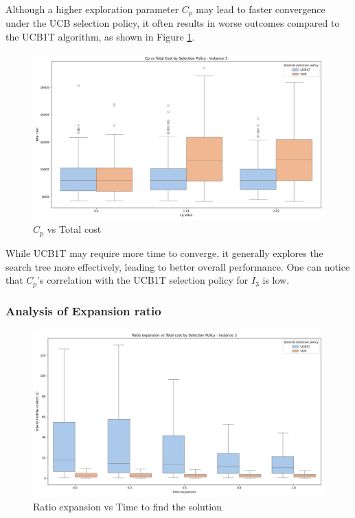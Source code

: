 Although a higher exploration parameter $C_p$ may lead to faster convergence under the UCB selection policy, it often results in worse outcomes compared to the UCB1T algorithm, as shown in Figure \ref{fig:cp_vs_cost_3}.
\begin{figure}[!ht]
    \centering
    \includegraphics[width=\textwidth]{Figures/3 - cp_vs_cost.png}
    \caption{$C_p$ vs Total cost}
    \label{fig:cp_vs_cost_3}
\end{figure}
While UCB1T may require more time to converge, it generally explores the search tree more effectively, leading to better overall performance. One can notice that $C_p$'s correlation with the UCB1T selection policy for $I_3$ is low.



\newpage
\subsubsection*{Analysis of Expansion ratio}

\begin{figure}[!ht]
    \centering
    \includegraphics[width=\textwidth]{Figures/3 - ratio_vs_time.png}
    \caption{Ratio expansion vs Time to find the solution}
    \label{fig:Ratio vs Time}
\end{figure}

